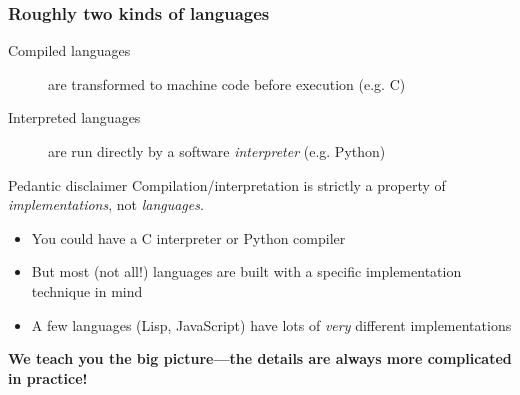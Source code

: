 \documentclass[rgb,dvipsnames,aspectratio=169,xcolor=table]{beamer}
\begin{document}
\begin{frame}
  \frametitle{Roughly two kinds of languages}

  \begin{description}
  \item[Compiled languages] are transformed to machine code before execution (e.g. C)
  \item[Interpreted languages] are run directly by a software
    \textit{interpreter} (e.g. Python)
  \end{description}

  \pause

  \begin{block}{Pedantic disclaimer}
    Compilation/interpretation is strictly a property of
    \textit{implementations}, not \textit{languages}.
  \end{block}

  \begin{itemize}
  \item You could have a C interpreter or Python compiler
  \item But most (not all!) languages are built with a specific
    implementation technique in mind
  \item A few languages (Lisp, JavaScript) have lots of \textit{very}
    different implementations
  \end{itemize}

  \pause\bigskip

  \begin{center}
  \textbf{We teach you the big picture---the details are always more
    complicated in practice!}
  \end{center}

\end{frame}
\end{document}
